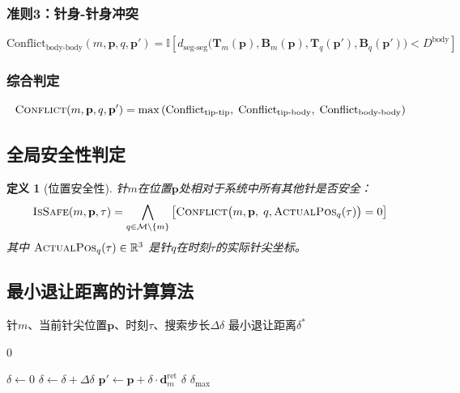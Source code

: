 \documentclass[11pt,a4paper]{article}
\newtheorem{definition}{定义}[section]
\begin{document}
\subsubsection{准则3：针身-针身冲突}
\begin{equation}
    \text{Conflict}_{\text{body-body}}(m,\mathbf{p},q,\mathbf{p}') = \mathbb{I}\left[ d_{\text{seg-seg}}\big(\mathbf{T}_m(\mathbf{p}), \mathbf{B}_m(\mathbf{p}), \mathbf{T}_q(\mathbf{p}'), \mathbf{B}_q(\mathbf{p}')\big) < D^{\text{body}} \right]
\end{equation}

\subsubsection{综合判定}
\begin{equation}
    \textsc{Conflict}(m, \mathbf{p}, q, \mathbf{p}') = \max\left( \text{Conflict}_{\text{tip-tip}},\; \text{Conflict}_{\text{tip-body}},\; \text{Conflict}_{\text{body-body}} \right)
\end{equation}

\subsection{全局安全性判定}

\begin{definition}[位置安全性]
针$m$在位置$\mathbf{p}$处相对于系统中所有其他针是否安全：
\begin{equation}
    \textsc{IsSafe}(m, \mathbf{p}, \tau) = \bigwedge_{q \in \mathcal{M} \setminus \{m\}} \left[ \textsc{Conflict}\big(m, \mathbf{p}, \; q, \textsc{ActualPos}_q(\tau)\big) = 0 \right]
\end{equation}
其中 $\textsc{ActualPos}_q(\tau) \in \mathbb{R}^3$ 是针$q$在时刻$\tau$的实际针尖坐标。
\end{definition}

\subsection{最小退让距离的计算算法} \label{sec:min_delta}

\begin{algorithm}[H]
\caption{最小安全退让距离计算 (ComputeMinRetract)}
\begin{algorithmic}[1]
\Require 针$m$、当前针尖位置$\mathbf{p}$、时刻$\tau$、搜索步长$\Delta\delta$
\Ensure 最小退让距离$\delta^*$

    \State \Return $0$ 
\EndIf

\State $\delta \leftarrow 0$
\While{$\delta \leq \delta_{\max}$}
    \State $\delta \leftarrow \delta + \Delta\delta$
    \State $\mathbf{p}' \leftarrow \mathbf{p} + \delta \cdot \mathbf{d}_m^{\text{ret}}$
        \State \Return $\delta$ 
    \EndIf
\EndWhile
\State \Return $\delta_{\max}$ 
\end{algorithmic}
\end{algorithm}
\end{document}
